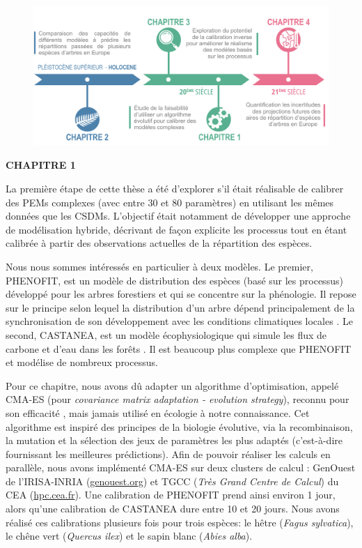\begin{figure}
\vspace*{-0cm}
\centering
\includegraphics{resume/figs/timeline_FR.pdf}
\vspace*{-0cm}
\end{figure}

\clearpage

{\noindent\large\bfseries\sffamily CHAPITRE 1}

La première étape de cette thèse a été d'explorer s'il était réalisable de calibrer des PEMs complexes (avec entre 30 et 80 paramètres) en utilisant les mêmes données que les CSDMs. L'objectif était notamment de développer une approche de modélisation hybride, décrivant de façon explicite les processus tout en étant calibrée à partir des observations actuelles de la répartition des espèces. 

Nous nous sommes intéressés en particulier à deux modèles. Le premier, PHENOFIT, est un modèle de distribution des espèces (basé sur les processus) développé pour les arbres forestiers et qui se concentre sur la phénologie. Il repose sur le principe selon lequel la distribution d'un arbre dépend principalement de la synchronisation de son développement avec les conditions climatiques locales \citep{Chuine2001}. Le second, CASTANEA, est un modèle écophysiologique qui simule les flux de carbone et d'eau dans les forêts \citep{Dufrene2005}. Il est beaucoup plus complexe que PHENOFIT et modélise de nombreux processus. 

Pour ce chapitre, nous avons dû adapter un algorithme d'optimisation, appelé CMA-ES (pour \emph{covariance matrix adaptation - evolution strategy}), reconnu pour son efficacité \citep{Hansen2001, Hansen2006}, mais jamais utilisé en écologie à notre connaissance. Cet algorithme est inspiré des principes de la biologie évolutive, via la recombinaison, la mutation et la sélection des jeux de paramètres les plus adaptés (c'est-à-dire fournissant les meilleures prédictions). Afin de pouvoir réaliser les calculs en parallèle, nous avons implémenté CMA-ES sur deux clusters de calcul : GenOuest de l'IRISA-INRIA (\href{https://www.genouest.org}{genouest.org}) et TGCC (\emph{Très Grand Centre de Calcul}) du CEA (\href{http://www-hpc.cea.fr/fr/complexe/tgcc.htm}{hpc.cea.fr}). Une calibration de PHENOFIT prend ainsi environ 1 jour, alors qu'une calibration de CASTANEA dure entre 10 et 20 jours. Nous avons réalisé ces calibrations plusieurs fois pour trois espèces: le hêtre (\emph{Fagus sylvatica}), le chêne vert (\emph{Quercus ilex}) et le sapin blanc (\emph{Abies alba}).

